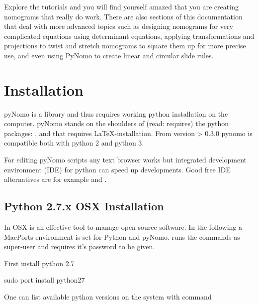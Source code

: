 \documentclass[a4paper,11pt,english]{sphinxmanual}
\begin{document}
Explore the tutorials and you will find yourself amazed that you are creating nomograms that really do work. There are also sections of this documentation that deal with more advanced topics such as designing nomograms for very complicated equations using determinant equations, applying transformations and projections to twist and stretch nomograms to square them up for more precise use, and even using PyNomo to create linear and circular slide rules.


\chapter{Installation}
\label{\detokenize{installation/installation:installation}}\label{\detokenize{installation/installation::doc}}
pyNomo is a   library and thus requires working python installation on the computer.
pyNomo stands on the shoulders  of (read: requires) the python packages: ,  and
 that requires LaTeX-installation. From version \textgreater{} 0.3.0 pynomo is compatible both with python 2 and python 3.

For editing pyNomo scripts any text browser works but integrated development environment (IDE) for python can speed up developments.
Good free IDE alternatives are for example  and .


\section{Python 2.7.x OSX Installation}
\label{\detokenize{installation/installation:python-2-7-x-osx-installation}}
In OSX  is an effective tool to manage open-source software. In the following a
MacPorts environment is set for Python and pyNomo.  runs the commands as super-user and requires it’s password to be given.

First install python 2.7

\begin{sphinxVerbatim}[commandchars=\\\{\},formatcom=\scriptsize]
\PYGZdl{} sudo port install python27
\end{sphinxVerbatim}

One can list available python versions on the system with command
\end{document}

